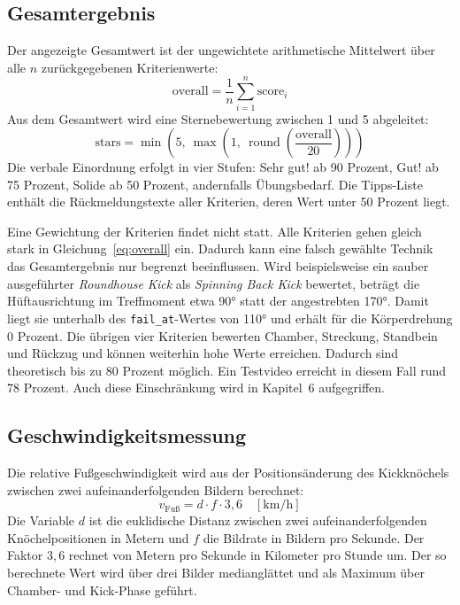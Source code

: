 \documentclass[intern]{cgMA}
\begin{document}
\subsection{Gesamtergebnis}
Der angezeigte Gesamtwert ist der ungewichtete arithmetische Mittelwert über alle $n$ zurückgegebenen Kriterienwerte:
\begin{equation}
\text{overall} = \frac{1}{n} \sum_{i=1}^{n} \text{score}_i
\label{eq:overall}
\end{equation}
Aus dem Gesamtwert wird eine Sternebewertung zwischen 1 und 5 abgeleitet:
\begin{equation}
\text{stars} = \min\!\left(5,\ \max\!\left(1,\ \operatorname{round}\!\left(\frac{\text{overall}}{20}\right)\right)\right)
\label{eq:stars}
\end{equation}
Die verbale Einordnung erfolgt in vier Stufen: \glqq{}Sehr gut!\grqq{} ab 90 Prozent, \glqq{}Gut!\grqq{} ab 75 Prozent, \glqq{}Solide\grqq{} ab 50 Prozent, andernfalls \glqq{}Übungsbedarf\grqq{}. Die Tipps-Liste enthält die Rückmeldungstexte aller Kriterien, deren Wert unter 50 Prozent liegt.

Eine Gewichtung der Kriterien findet nicht statt. Alle Kriterien gehen gleich stark in Gleichung~\ref{eq:overall} ein. Dadurch kann eine falsch gewählte Technik das Gesamtergebnis nur begrenzt beeinflussen. Wird beispielsweise ein sauber ausgeführter \textit{Roundhouse Kick} als \textit{Spinning Back Kick} bewertet, beträgt die Hüftausrichtung im Treffmoment etwa 90° statt der angestrebten 170°. Damit liegt sie unterhalb des \texttt{fail\_at}-Wertes von 110° und erhält für die Körperdrehung 0 Prozent. Die übrigen vier Kriterien bewerten Chamber, Streckung, Standbein und Rückzug und können weiterhin hohe Werte erreichen. Dadurch sind theoretisch bis zu 80 Prozent möglich. Ein Testvideo erreicht in diesem Fall rund 78 Prozent. Auch diese Einschränkung wird in Kapitel~6 aufgegriffen.
\subsection{Geschwindigkeitsmessung}
Die relative Fußgeschwindigkeit wird aus der Positionsänderung des Kickknöchels zwischen zwei aufeinanderfolgenden Bildern berechnet:
\begin{equation}
v_{\text{Fuß}} = d \cdot f \cdot 3{,}6 \quad [\text{km/h}]
\label{eq:speed}
\end{equation}
Die Variable $d$ ist die euklidische Distanz zwischen zwei aufeinanderfolgenden Knöchelpositionen in Metern und $f$ die Bildrate in Bildern pro Sekunde. Der Faktor $3{,}6$ rechnet von Metern pro Sekunde in Kilometer pro Stunde um. Der so berechnete Wert wird über drei Bilder medianglättet und als Maximum über Chamber- und Kick-Phase geführt.
\end{document}
